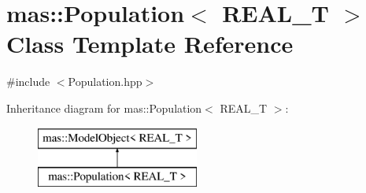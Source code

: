 \hypertarget{classmas_1_1_population}{\section{mas\-:\-:Population$<$ R\-E\-A\-L\-\_\-\-T $>$ Class Template Reference}
\label{classmas_1_1_population}
}


{\ttfamily \#include $<$Population.\-hpp$>$}

Inheritance diagram for mas\-:\-:Population$<$ R\-E\-A\-L\-\_\-\-T $>$\-:\begin{figure}[H]
\begin{center}
\leavevmode
\includegraphics[height=2.000000cm]{classmas_1_1_population}
\end{center}
\end{figure}
